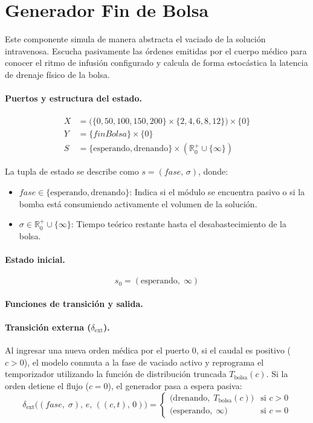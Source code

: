 \documentclass{article}
\newcommand{\dext}{\delta_{\mathrm{ext}}}
\begin{document}
\clearpage
\section{Generador Fin de Bolsa }

Este componente simula de manera abstracta el vaciado de la solución intravenosa. Escucha pasivamente las órdenes emitidas por el cuerpo médico para conocer el ritmo de infusión configurado y calcula de forma estocástica la latencia de drenaje físico de la bolsa.

\paragraph{Puertos y estructura del estado.}
\begin{align*}
  X &= \bigl( \{0, 50, 100, 150, 200\} \times \{2, 4, 6, 8, 12\} \bigr) \times \{0\} \\[4pt]
  Y &= \{\mathit{finBolsa}\} \times \{0\} \\[4pt]
  S &= \{\text{esperando}, \text{drenando}\} \times (\mathbb{R}_0^+ \cup \{\infty\})
\end{align*}

La tupla de estado se describe como $s = (\mathit{fase},\, \sigma)$, donde:
\begin{itemize}
  \item $\mathit{fase} \in \{\text{esperando}, \text{drenando}\}$: Indica si el módulo se encuentra pasivo o si la bomba está consumiendo activamente el volumen de la solución.
  \item $\sigma \in \mathbb{R}_0^+ \cup \{\infty\}$: Tiempo teórico restante hasta el desabastecimiento de la bolsa.
\end{itemize}

\paragraph{Estado inicial.}
\[
  s_0 = (\text{esperando},\; \infty)
\]

\paragraph{Funciones de transición y salida.}

\paragraph{Transición externa ($\dext$).}
Al ingresar una nueva orden médica por el puerto 0, si el caudal es positivo ($c > 0$), el modelo conmuta a la fase de vaciado activo y reprograma el temporizador utilizando la función de distribución truncada $T_{\mathrm{bolsa}}(c)$. Si la orden detiene el flujo ($c = 0$), el generador pasa a espera pasiva:
\[
  \dext\bigl((\mathit{fase},\; \sigma),\, e,\, ((c, t),\, 0)\bigr) =
  \begin{cases}
    \bigl(\text{drenando},\; T_{\mathrm{bolsa}}(c)\bigr) & \text{si } c > 0 \\[4pt]
    \bigl(\text{esperando},\; \infty\bigr) & \text{si } c = 0
  \end{cases}
\]
\end{document}
